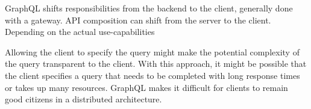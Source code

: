 \bigskip

\noindent GraphQL shifts responsibilities from the backend to the client, generally done with a gateway. API composition can shift from the server to the client. Depending on the actual use-capabilities

\bigskip

\noindent Allowing the client to specify the query might make the potential complexity of the query transparent to the client. With this approach, it might be possible that the client specifies a query that needs to be completed with long response times or takes up many resources. GraphQL makes it difficult for clients to remain good citizens in a distributed architecture. \cite{book:2018:richardson:background:bff:microservices-patterns}





